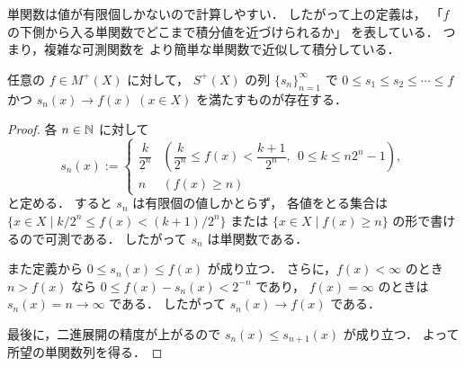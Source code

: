 \begin{remark}
単関数は値が有限個しかないので計算しやすい．
したがって上の定義は，
「$f$ の下側から入る単関数でどこまで積分値を近づけられるか」
を表している．
つまり，複雑な可測関数を
より簡単な単関数で近似して積分している．
\end{remark}

\begin{lemma}[単関数による近似]\label{lem:simple-function-approximation}
任意の $f\in M^+(X)$ に対して，
$S^+(X)$ の列 $\{s_n\}_{n=1}^{\infty}$ で $0 \le s_1 \le s_2 \le \cdots \le f$ かつ
$s_n(x) \to f(x)$ $(x \in X)$ を満たすものが存在する．
\end{lemma}
\begin{proof}
各 $n \in \mathbb N$ に対して
\[
s_n(x)
:=
\begin{cases}
\dfrac{k}{2^n}
&\left(
\dfrac{k}{2^n} \le f(x) < \dfrac{k+1}{2^n},
\ \ 0 \le k \le n2^n-1
\right),\\[1.2ex]
n & (f(x)\ge n)
\end{cases}
\]
と定める．
すると $s_n$ は有限個の値しかとらず，
各値をとる集合は $\{x \in X \mid k/2^n \le f(x) < (k+1)/2^n\}$ または
$\{x \in X \mid f(x)\ge n\}$ の形で書けるので可測である．
したがって $s_n$ は単関数である．

また定義から $0 \le s_n(x) \le f(x)$ が成り立つ．
さらに，$f(x)<\infty$ のとき $n>f(x)$ なら $0 \le f(x)-s_n(x)<2^{-n}$ であり，
$f(x)=\infty$ のときは $s_n(x)=n \to \infty$ である．
したがって $s_n(x)\to f(x)$ である．

最後に，二進展開の精度が上がるので $s_n(x)\le s_{n+1}(x)$ が成り立つ．
よって所望の単関数列を得る．
\end{proof}


